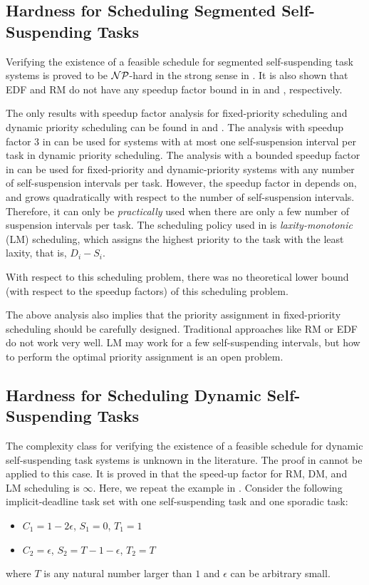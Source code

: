 \subsection{Hardness for Scheduling Segmented Self-Suspending Tasks}
Verifying the existence of a feasible schedule for segmented self-suspending task systems is proved to be ${\cal NP}$-hard in the strong sense in \cite{Ridouard_2004}. It is also shown that EDF and RM do not have any speedup factor bound in in \cite{Ridouard_2004} and \cite{RTSS-ChenL14}, respectively. 

The only results with speedup factor analysis for fixed-priority scheduling and dynamic priority scheduling can be found in \cite{RTSS-ChenL14} and \cite{WC16-suspend-DATE}. The analysis with speedup factor $3$ in \cite{RTSS-ChenL14} can be used for systems with at most one self-suspension interval per task in dynamic priority scheduling. The analysis with a bounded speedup factor in \cite{WC16-suspend-DATE} can be used for fixed-priority and dynamic-priority systems with any number of self-suspension intervals per task. However, the speedup factor in \cite{WC16-suspend-DATE} depends on, and grows quadratically with respect to the number of self-suspension intervals. Therefore, it can only be \emph{practically} used when there are only a few number of suspension intervals per task. The scheduling policy used in \cite{WC16-suspend-DATE} is \emph{laxity-monotonic} (LM) scheduling, which assigns the highest priority to the task with the least laxity, that is, $D_i-S_i$.

With respect to this scheduling problem, there was no theoretical lower bound (with respect to the speedup factors) of this scheduling problem. 


The above analysis also implies that the priority assignment in fixed-priority scheduling should be carefully designed. Traditional approaches like RM or EDF do not work very well. LM may work for a few self-suspending intervals, but how to perform the optimal priority assignment is an open problem.


\subsection{Hardness for Scheduling Dynamic Self-Suspending Tasks}
The complexity class for verifying the existence of a feasible schedule for dynamic self-suspending task systems is unknown in the literature. The proof in \cite{Ridouard_2004} cannot be applied to this case. 
It is proved in \cite{huangpass:dac2015} that the speed-up factor for RM, DM, and LM scheduling is $\infty$. Here, we repeat the example in \cite{huangpass:dac2015}. Consider the following implicit-deadline task set with one self-suspending task and one sporadic task:
\begin{itemize}
 \setlength\itemsep{0em}
\item $C_1=1-2\epsilon$, $S_1=0$, $T_1=1$
\item  $C_2=\epsilon$, $S_2=T-1-\epsilon$, $T_2=T$
\end{itemize}
where $T$ is any natural number larger than $1$ and $\epsilon$ can be arbitrary small.

